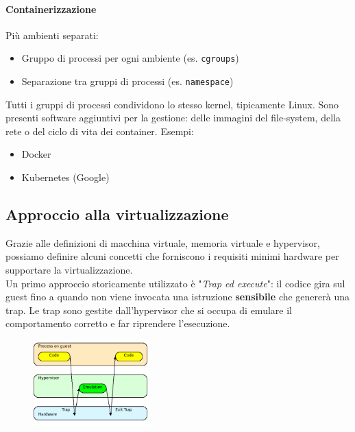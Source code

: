 \documentclass{article}
\begin{document}
		\paragraph{Containerizzazione}
		Più ambienti separati:
		\begin{itemize}
		    \item Gruppo di processi per ogni ambiente (es. \verb*|cgroups|)
		    \item Separazione tra gruppi di processi (es. \verb*|namespace|)
		\end{itemize}  
		Tutti i gruppi di processi condividono lo stesso kernel, tipicamente Linux. Sono presenti software aggiuntivi per la gestione: delle immagini del file-system, della rete o del ciclo di vita dei container.\newline
		Esempi:
		\begin{itemize}
		    \item Docker
		    \item Kubernetes (Google)
		\end{itemize}
		
		\subsection{Approccio alla virtualizzazione}
		Grazie alle definizioni di macchina virtuale, memoria virtuale e hypervisor, possiamo definire alcuni concetti che forniscono i requisiti minimi hardware per supportare la virtualizzazione.\\
		
		Un primo approccio storicamente utilizzato è "\emph{Trap ed execute}": il codice gira sul guest fino a quando non viene invocata una istruzione \textbf{sensibile} che genererà una trap. Le trap sono gestite dall'hypervisor che si occupa di emulare il comportamento corretto e far riprendere l'esecuzione.
		
		\begin{figure}[ht]
			\centering
			\includegraphics[width=0.4\textwidth]{SAC_B1_hypervisorTrap.png}
		\end{figure}
		
\end{document}
